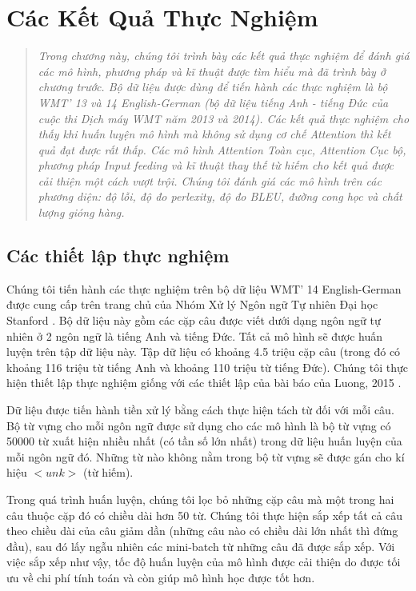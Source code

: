 \chapter{Các Kết Quả Thực Nghiệm}
\ifpdf
    \graphicspath{{Chapter4/Chapter4Figs/PNG/}{Chapter4/Chapter4Figs/PDF/}{Chapter4/Chapter4Figs/}}
\else
    \graphicspath{{Chapter4/Chapter4Figs/EPS/}{Chapter4/Chapter4Figs/}}
\fi
\label{chap_4}
\begin{quote}
\textit{Trong chương này, chúng tôi trình bày các kết quả thực nghiệm để đánh giá các mô hình, phương pháp và kĩ thuật được tìm hiểu mà đã trình bày ở chương trước. Bộ dữ liệu được dùng để tiến hành các thực nghiệm là bộ WMT' 13 và 14 English-German (bộ dữ liệu tiếng Anh - tiếng Đức của cuộc thi Dịch máy WMT năm 2013 và 2014). Các kết quả thực nghiệm cho thấy khi huấn luyện mô hình mà không sử dụng cơ chế Attention thì kết quả đạt được rất thấp. Các mô hình Attention Toàn cục, Attention Cục bộ, phương pháp Input feeding và kĩ thuật thay thế từ hiếm cho kết quả được cải thiện một cách vượt trội. Chúng tôi đánh giá các mô hình trên các phương diện: độ lỗi, độ đo perlexity, độ đo BLEU, đường cong học và chất lượng gióng hàng.}
\end{quote}
\section{Các thiết lập thực nghiệm}
Chúng tôi tiến hành các thực nghiệm trên bộ dữ liệu WMT' 14 English-German được cung cấp trên trang chủ của Nhóm Xử lý Ngôn ngữ Tự nhiên Đại học Stanford \cite{StanfordNMT}. Bộ dữ liệu này gồm các cặp câu được viết dưới dạng ngôn ngữ tự nhiên ở 2 ngôn ngữ là tiếng Anh và tiếng Đức. Tất cả mô hình sẽ được huấn luyện trên tập dữ liệu này. Tập dữ liệu có khoảng 4.5 triệu cặp câu (trong đó có khoảng 116 triệu từ tiếng Anh và khoảng 110 triệu từ tiếng Đức). Chúng tôi thực hiện thiết lập thực nghiệm giống với các thiết lập của bài báo của Luong, 2015 \cite{attentionThangLuong2015}.

Dữ liệu được tiến hành tiền xử lý bằng cách thực hiện tách từ đối với mỗi câu. Bộ từ vựng cho mỗi ngôn ngữ được sử dụng cho các mô hình là bộ từ vựng có 50000 từ xuất hiện nhiều nhất (có tần số lớn nhất) trong dữ liệu huấn luyện của mỗi ngôn ngữ đó. Những từ nào không nằm trong bộ từ vựng sẽ được gán cho kí hiệu $<unk>$ (từ hiếm).

Trong quá trình huấn luyện, chúng tôi lọc bỏ những cặp câu mà một trong hai câu thuộc cặp đó có chiều dài hơn 50 từ. Chúng tôi thực hiện sắp xếp tất cả câu theo chiều dài của câu giảm dần (những câu nào có chiều dài lớn nhất thì đứng đầu), sau đó lấy ngẫu nhiên các mini-batch từ những câu đã được sắp xếp. Với việc sắp xếp như vậy, tốc độ huấn luyện của mô hình được cải thiện do được tối ưu về chi phí tính toán và còn giúp mô hình học được tốt hơn.

